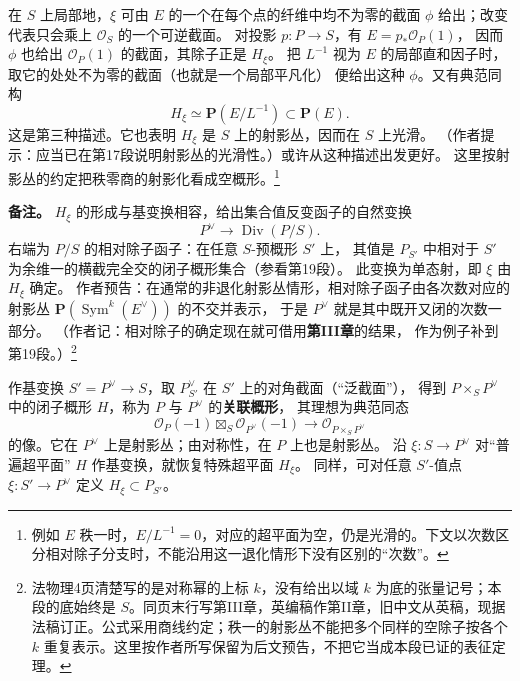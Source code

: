 \documentclass[openany,fontset=fandol]{ctexbook}
\newcommand{\PP}{\mathbf P}
\newcommand{\OO}{\mathcal O}
\newcommand{\Div}{\operatorname{Div}}
\begin{document}
在 \(S\) 上局部地，\(\xi\) 可由 \(E\) 的一个在每个点的纤维中均不为零的截面
\(\phi\) 给出；改变代表只会乘上 \(\OO_S\) 的一个可逆截面。
对投影 \(p:P\to S\)，有 \(E=p_*\OO_P(1)\)，
因而 \(\phi\) 也给出 \(\OO_P(1)\) 的截面，其除子正是 \(H_\xi\)。
把 \(L^{-1}\) 视为 \(E\) 的局部直和因子时，取它的处处不为零的截面（也就是一个局部平凡化）
便给出这种 \(\phi\)。又有典范同构
\[
 H_\xi\simeq \PP(E/L^{-1})\subset \PP(E).
\]
这是第三种描述。它也表明 \(H_\xi\) 是 \(S\) 上的射影丛，因而在 \(S\) 上光滑。
（作者提示：应当已在第17段说明射影丛的光滑性。）或许从这种描述出发更好。
这里按射影丛的约定把秩零商的射影化看成空概形。\footnote{例如 \(E\) 秩一时，\(E/L^{-1}=0\)，对应的超平面为空，仍是光滑的。下文以次数区分相对除子分支时，不能沿用这一退化情形下没有区别的“次数”。}

\noindent\textbf{备注。}
\(H_\xi\) 的形成与基变换相容，给出集合值反变函子的自然变换
\[
 P^\vee\longrightarrow \Div(P/S).
\]
右端为 \(P/S\) 的相对除子函子：在任意 \(S\)-预概形 \(S'\) 上，
其值是 \(P_{S'}\) 中相对于 \(S'\) 为余维一的横截完全交的闭子概形集合（参看第19段）。
此变换为单态射，即 \(\xi\) 由 \(H_\xi\) 确定。
作者预告：在通常的非退化射影丛情形，相对除子函子由各次数对应的射影丛
\(\PP(\operatorname{Sym}^k(E^\vee))\) 的不交并表示，
于是 \(P^\vee\) 就是其中既开又闭的次数一部分。
（作者记：相对除子的确定现在就可借用\textbf{第III章}的结果，
作为例子补到第19段。）\footnote{法物理4页清楚写的是对称幂的上标 \(k\)，没有给出以域 \(k\) 为底的张量记号；本段的底始终是 \(S\)。同页末行写第III章，英编稿作第II章，旧中文从英稿，现据法稿订正。公式采用商线约定；秩一的射影丛不能把多个同样的空除子按各个 \(k\) 重复表示。这里按作者所写保留为后文预告，不把它当成本段已证的表征定理。}

作基变换 \(S'=P^\vee\to S\)，取 \(P^\vee_{S'}\) 在 \(S'\) 上的对角截面（“泛截面”），
得到 \(P\times_S P^\vee\) 中的闭子概形 \(H\)，称为 \(P\) 与 \(P^\vee\) 的\textbf{关联概形}，
其理想为典范同态
\[
 \OO_P(-1)\boxtimes_S\OO_{P^\vee}(-1)
 \longrightarrow \OO_{P\times_S P^\vee}
\]
的像。它在 \(P^\vee\) 上是射影丛；由对称性，在 \(P\) 上也是射影丛。
沿 \(\xi:S\to P^\vee\) 对“普遍超平面” \(H\) 作基变换，就恢复特殊超平面 \(H_\xi\)。
同样，可对任意 \(S'\)-值点 \(\xi:S'\to P^\vee\) 定义 \(H_\xi\subset P_{S'}\)。
\end{document}
